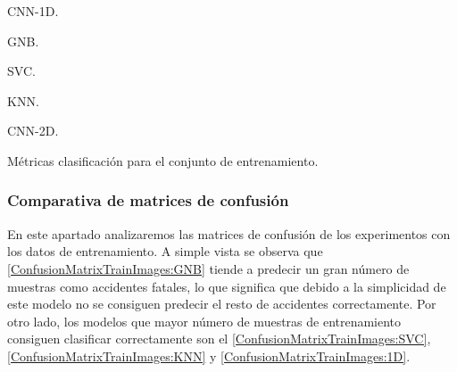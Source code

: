     \begin{table}[H]
        \scriptsize
        \renewcommand{\arraystretch}{1.1}
        \begin{subtable}{.5\textwidth}        
          \caption{CNN-1D.}
          \label{TrainClassificationReport:CNN1D}
        \end{subtable}
        \hspace{1em}
        \begin{subtable}{.5\textwidth}
          \caption{GNB.}
          \label{TrainClassificationReport:GNB}
        \end{subtable}
        \vspace*{2mm}
        \begin{subtable}{.5\textwidth}  
          \centering
          \caption{SVC.}
          \label{TrainClassificationReport:SVC}
        \end{subtable}
        \hspace{1em}
        \begin{subtable}{.5\textwidth}
          \caption{KNN.}
          \label{TrainClassificationReport:KNN}
        \end{subtable}
        \vspace*{2mm}
        \begin{subtable}{1\textwidth}
          \centering
          \caption{CNN-2D.}
          \label{TrainClassificationReport:CNN2D}
        \end{subtable}
        \caption{Métricas clasificación para el conjunto de entrenamiento.}
        \label{TrainClassificationReport}
    \end{table}

  \subsubsection{Comparativa de matrices de confusión}

    En este apartado analizaremos las matrices de confusión de los experimentos con los datos de entrenamiento. A simple vista se observa que  \eqref{ConfusionMatrixTrainImages:GNB} tiende a predecir un gran número de muestras como accidentes fatales, lo que significa que debido a la simplicidad de este modelo no se consiguen predecir el resto de accidentes correctamente. Por otro lado, los modelos que mayor número de muestras de entrenamiento consiguen clasificar correctamente son el  \eqref{ConfusionMatrixTrainImages:SVC},  \eqref{ConfusionMatrixTrainImages:KNN} y  \eqref{ConfusionMatrixTrainImages:1D}.

